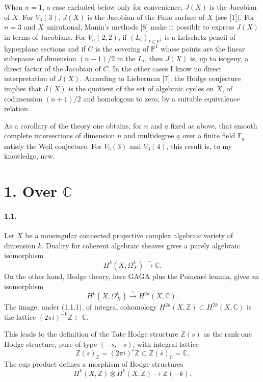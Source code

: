 \documentclass[10pt]{article}
\newcommand{\C}{\mathbb C}
\newcommand{\F}{\mathbb F}
\newcommand{\Pj}{\mathbb P}
\newcommand{\Z}{\mathbb Z}
\newcommand{\iso}{\xrightarrow{\sim}}
\begin{document}
When \(n=1\), a case excluded below only for convenience, \(J(X)\) is the Jacobian of \(X\). For \(V_3(3)\), \(J(X)\) is the Jacobian of the Fano surface of \(X\) (see [1]). For \(n=3\) and \(X\) unirational, Manin's methods [8] make it possible to express \(J(X)\) in terms of Jacobians. For \(V_n(2,2)\), if \((L_t)_{t\in\Pj^1}\) is a Lefschetz pencil of hyperplane sections and if \(C\) is the covering of \(\Pj^1\) whose points are the linear subspaces of dimension \((n-1)/2\) in the \(L_t\), then \(J(X)\) is, up to isogeny, a direct factor of the Jacobian of \(C\). In the other cases I know no direct interpretation of \(J(X)\). According to Lieberman [7], the Hodge conjecture implies that \(J(X)\) is the quotient of the set of algebraic cycles on \(X\), of codimension \((n+1)/2\) and homologous to zero, by a suitable equivalence relation.

As a corollary of the theory one obtains, for \(n\) and \(\underline a\) fixed as above, that smooth complete intersections of dimension \(n\) and multidegree \(\underline a\) over a finite field \(\F_q\) satisfy the Weil conjecture. For \(V_5(3)\) and \(V_3(4)\), this result is, to my knowledge, new.

\section*{1. Over \(\C\)}

\paragraph{1.1.} Let \(X\) be a nonsingular connected projective complex algebraic variety of dimension \(k\). Duality for coherent algebraic sheaves gives a purely algebraic isomorphism
\[
\tag{1.1.1}
H^k(X,\Omega_X^k)\iso\C.
\]
On the other hand, Hodge theory, here GAGA plus the Poincaré lemma, gives an isomorphism
\[
\tag{1.1.2}
H^k(X,\Omega_X^k)\iso H^{2k}(X,\C).
\]
The image, under (1.1.1), of integral cohomology \(H^{2k}(X,\Z)\subset H^{2k}(X,\C)\) is the lattice \((2\pi i)^{-k}\Z\subset\C\).

This leads to the definition of the Tate Hodge structure \(\Z(s)\) as the rank-one Hodge structure, pure of type \((-s,-s)\), with integral lattice
\[
\Z(s)_\Z=(2\pi i)^s\Z\subset \Z(s)_\C=\C.
\]
The cup product defines a morphism of Hodge structures
\[
\tag{1.1.3}
H^k(X,\Z)\otimes H^k(X,\Z)\longrightarrow\Z(-k).
\]
\end{document}
